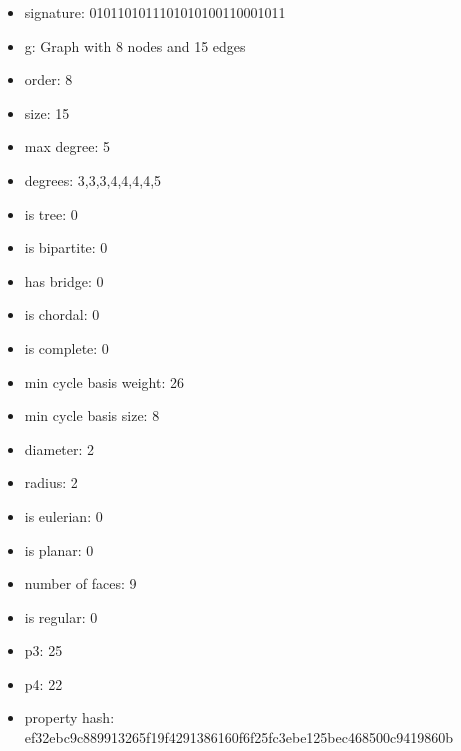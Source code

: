 \begin{itemize}
\item signature: 0101101011101010100110001011
\item g: Graph with 8 nodes and 15 edges
\item order: 8
\item size: 15
\item max degree: 5
\item degrees: 3,3,3,4,4,4,4,5
\item is tree: 0
\item is bipartite: 0
\item has bridge: 0
\item is chordal: 0
\item is complete: 0
\item min cycle basis weight: 26
\item min cycle basis size: 8
\item diameter: 2
\item radius: 2
\item is eulerian: 0
\item is planar: 0
\item number of faces: 9
\item is regular: 0
\item p3: 25
\item p4: 22
\item property hash: ef32ebc9c889913265f19f4291386160f6f25fc3ebe125bec468500c9419860b
\end{itemize}
\newpage
\begin{figure}
\end{figure}
